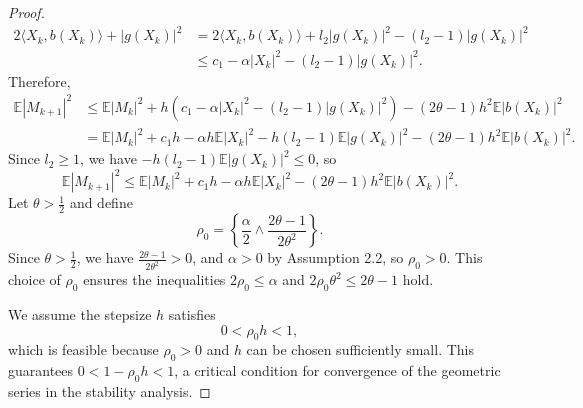 \documentclass{article}
\begin{document}
\begin{proof}
\[\begin{aligned}
	2\langle X_k, b(X_k) \rangle + |g(X_k)|^2 &= 2\langle X_k, b(X_k) \rangle + l_2 |g(X_k)|^2 - (l_2 - 1)|g(X_k)|^2 \\
	&\leq c_1 - \alpha |X_k|^2 - (l_2 - 1)|g(X_k)|^2.
\end{aligned}
\]  
Therefore,  
\[
\begin{aligned}
	\mathbb{E}|M_{k+1}|^2 &\leq \mathbb{E}|M_k|^2 + h\left(c_1 - \alpha |X_k|^2 - (l_2 - 1)|g(X_k)|^2\right) - (2\theta - 1)h^2 \mathbb{E}|b(X_k)|^2 \\
	&= \mathbb{E}|M_k|^2 + c_1 h - \alpha h \mathbb{E}|X_k|^2 - h(l_2 - 1)\mathbb{E}|g(X_k)|^2 - (2\theta - 1)h^2 \mathbb{E}|b(X_k)|^2.
\end{aligned}
\]  
Since $ l_2 \geq 1 $, we have $ -h(l_2 - 1)\mathbb{E}|g(X_k)|^2 \leq 0 $, so  
\[
\mathbb{E}|M_{k+1}|^2 \leq \mathbb{E}|M_k|^2 + c_1 h - \alpha h \mathbb{E}|X_k|^2 - (2\theta - 1)h^2 \mathbb{E}|b(X_k)|^2.
\]  
Let $\theta > \frac{1}{2}$ and define  
\[
\rho_0 = \left\{\dfrac{\alpha}{2} \wedge \dfrac{2\theta - 1}{2\theta^2}\right\}.
\]  
Since $\theta > \frac{1}{2}$, we have $\frac{2\theta - 1}{2\theta^2} > 0$, and $\alpha > 0$ by Assumption 2.2, so $\rho_0 > 0$. This choice of $\rho_0$ ensures the inequalities $2\rho_0 \leq \alpha$ and $2\rho_0\theta^2 \leq 2\theta - 1$ hold.


We assume the stepsize $h$ satisfies  
\[
0 < \rho_0 h < 1,
\]  
which is feasible because $\rho_0 > 0$ and $h$ can be chosen sufficiently small. This guarantees $0 < 1 - \rho_0 h < 1$, a critical condition for convergence of the geometric series in the stability analysis.


\end{proof}
\end{document}
